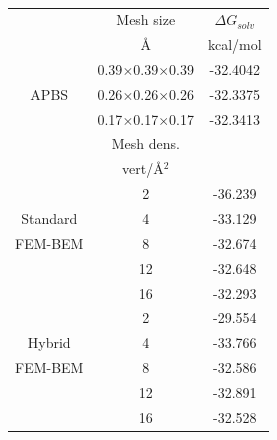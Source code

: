 \begin{table}
\centering
\begin{tabular}{c|c|c}
&Mesh size & $\Delta G_{solv}$\\
&\AA       &  kcal/mol \\
\hline
\multirow{3}{*}{APBS}& 0.39$\times$0.39$\times$0.39 & -32.4042\\ 
&0.26$\times$0.26$\times$0.26 & -32.3375\\ 
&0.17$\times$0.17$\times$0.17 & -32.3413\\ 
\hline
&Mesh dens. & \\
&vert/\AA$^2$ & \\
\hline
    & 2 & -36.239\\
Standard    & 4  & -33.129 \\
FEM-BEM    & 8  & -32.674 \\
    & 12 & -32.648 \\
    & 16 & -32.293 \\
\hline
    & 2 & -29.554\\
Hybrid    & 4  & -33.766 \\
FEM-BEM    & 8  & -32.586 \\
    & 12 & -32.891 \\
    & 16 & -32.528 \\
\hline
\end{tabular}
\caption{}
\end{table}
%

